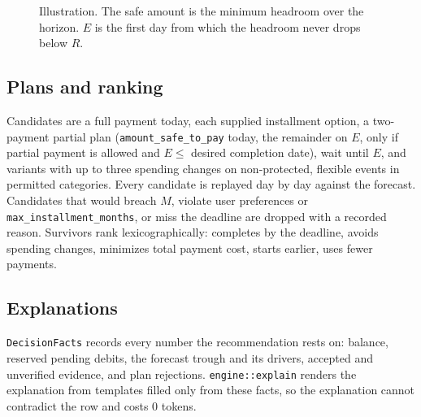 \documentclass[11pt,a4paper]{article}
\begin{document}
\begin{figure}[h]
\centering
{}
\caption{Illustration. The safe amount is the minimum headroom over the horizon. $E$ is the first day from which the headroom never drops below $R$.}
\end{figure}

\subsection{Plans and ranking}
Candidates are a full payment today, each supplied installment option, a two-payment partial plan
(\texttt{amount\_safe\_to\_pay} today, the remainder on $E$, only if partial payment is allowed and $E\le$ desired
completion date), wait until $E$, and variants with up to three spending changes on non-protected, flexible events in
permitted categories. Every candidate is replayed day by day against the forecast. Candidates that would breach
$M$, violate user preferences or \texttt{max\_installment\_months}, or miss the deadline are dropped with a recorded
reason. Survivors rank lexicographically: completes by the deadline, avoids spending changes, minimizes total payment
cost, starts earlier, uses fewer payments.

\subsection{Explanations}
\texttt{DecisionFacts} records every number the recommendation rests on: balance, reserved pending debits, the forecast
trough and its drivers, accepted and unverified evidence, and plan rejections. \texttt{engine::explain} renders the
explanation from templates filled only from these facts, so the explanation cannot contradict the row and costs 0 tokens.
\end{document}
